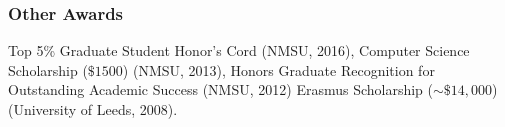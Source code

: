 \subsubsection*{\sc Other Awards}
Top 5\% Graduate Student Honor's Cord (NMSU, 2016),
Computer Science Scholarship ($\$ 1500$) (NMSU, 2013),
Honors Graduate Recognition for Outstanding Academic Success (NMSU, 2012)
Erasmus Scholarship ($\sim \$ 14,000$) (University of Leeds, 2008).



	


